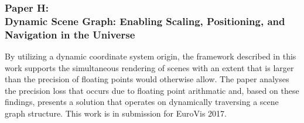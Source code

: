 
\subsubsection{Paper H:\\Dynamic Scene Graph: Enabling Scaling, Positioning, and Navigation in the Universe}
By utilizing a dynamic coordinate system origin, the framework described in this work supports the simultaneous rendering of scenes with an extent that is larger than the precision of floating points would otherwise allow. The paper analyses the precision loss that occurs due to floating point arithmatic and, based on these findings, presents a solution that operates on dynamically traversing a scene graph structure. This work is in submission for EuroVis 2017.


